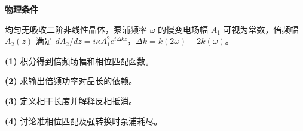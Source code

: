 \textbf{物理条件}\par 均匀无吸收二阶非线性晶体，泵浦频率 \(\omega\) 的慢变电场幅 \(A_1\) 可视为常数，倍频幅 \(A_2(z)\) 满足 \(dA_2/dz=i\kappa A_1^2 e^{i\Delta k z}\)，\(\Delta k=k(2\omega)-2k(\omega)\)。
\par\noindent\textbf{(1)} 积分得到倍频场幅和相位匹配函数。
\par\noindent\textbf{(2)} 求输出倍频功率对晶长的依赖。
\par\noindent\textbf{(3)} 定义相干长度并解释反相抵消。
\par\noindent\textbf{(4)} 讨论准相位匹配及强转换时泵浦耗尽。
